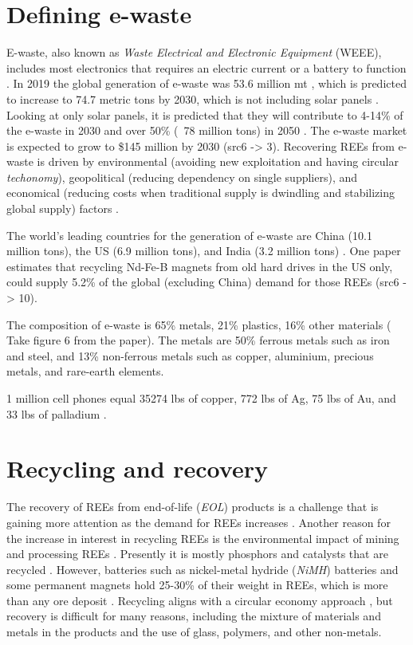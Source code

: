 
\section{Defining e-waste}

E-waste, also known as \textit{Waste Electrical and Electronic Equipment} (WEEE), includes most electronics that requires an electric current or a battery to function \cite{WEEE}. In 2019 the global generation of e-waste was 53.6 million mt \cite{sanchez2024}, which is predicted to increase to 74.7 metric tons by 2030, which is not including solar panels \cite{javed2024}. Looking at only solar panels, it is predicted that they will contribute to 4-14\% of the e-waste in 2030 and over 50\% (~78 million tons) in 2050 \cite{javed2024}. The e-waste market is expected to grow to \$145 million by 2030 (src6 -> 3). Recovering REEs from e-waste is driven by environmental (avoiding new exploitation and having circular \textit{techonomy}), geopolitical (reducing dependency on single suppliers), and economical (reducing costs when traditional supply is dwindling and stabilizing global supply) factors \cite{sanchez2024}.

The world's leading countries for the generation of e-waste are China (10.1 million tons), the US (6.9 million tons), and India (3.2 million tons) \cite{javed2024}. One paper estimates that recycling Nd-Fe-B magnets from old hard drives in the US only, could supply 5.2\% of the global (excluding China) demand for those REEs (src6 -> 10).

The composition of e-waste is 65\% metals, 21\% plastics, 16\% other materials (\cite{javed2024} Take figure 6 from the paper). The metals are 50\% ferrous metals such as iron and steel, and 13\% non-ferrous metals such as copper, aluminium, precious metals, and rare-earth elements. 

1 million cell phones equal 35274 lbs of copper, 772 lbs of Ag, 75 lbs of Au, and 33 lbs of palladium \cite{javed2024}.

\section{Recycling and recovery}

The recovery of REEs from end-of-life (\textit{EOL}) products is a challenge that is gaining more attention as the demand for REEs increases \cite{USDoE2024}. Another reason for the increase in interest in recycling REEs is the environmental impact of mining and processing REEs \cite{USDoE2024}. Presently it is mostly phosphors and catalysts that are recycled \cite{britannica2024}. However, batteries such as nickel-metal hydride (\textit{NiMH}) batteries and some permanent magnets hold 25-30\% of their weight in REEs, which is more than any ore deposit \cite{britannica2024}. Recycling aligns with a circular economy approach \cite{circular2016}, but recovery is difficult for many reasons, including the mixture of materials and metals in the products and the use of glass, polymers, and other non-metals.

